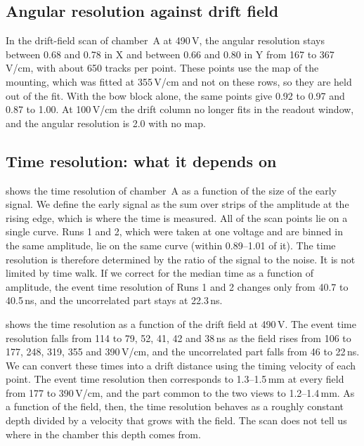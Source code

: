 \subsection{Angular resolution against drift field}
In the drift-field scan of chamber~A at 490\,V, the angular resolution stays between 0.68 and 0.78\textdegree{} in X
and between 0.66 and 0.80\textdegree{} in Y from 167 to 367\,V/cm, with about 650 tracks per point. These points use
the map of the mounting, which was fitted at 355\,V/cm and not on these rows, so they are held out of the fit. With
the bow block alone, the same points give 0.92 to 0.97\textdegree{} and 0.87 to 1.00\textdegree. At 100\,V/cm the
drift column no longer fits in the readout window, and the angular resolution is 2.0\textdegree{} with no map.

\subsection{Time resolution: what it depends on}\label{app:timingdetails}
 shows the time resolution of chamber~A as a function of the size of the early signal. We define the
early signal as the sum over strips of the amplitude at the rising edge, which is where the time is measured. All of
the scan points lie on a single curve. Runs 1 and 2, which were taken at one voltage and are binned in the same
amplitude, lie on the same curve (within 0.89--1.01 of it). The time resolution is therefore determined by the ratio
of the signal to the noise. It is not limited by time walk. If we correct for the median time as a function of
amplitude, the event time resolution of Runs 1 and 2 changes only from 40.7 to 40.5\,ns, and the uncorrelated part
stays at 22.3\,ns.

 shows the time resolution as a function of the drift field at 490\,V. The event time
resolution falls from 114 to 79, 52, 41, 42 and 38\,ns as the field rises from 106 to 177, 248, 319, 355 and
390\,V/cm, and the uncorrelated part falls from 46 to 22\,ns. We can convert these times into a drift distance using
the timing velocity of each point. The event time resolution then corresponds to 1.3--1.5\,mm at every field from 177
to 390\,V/cm, and the part common to the two views to 1.2--1.4\,mm. As a function of the field, then, the time
resolution behaves as a roughly constant depth divided by a velocity that grows with the field. The scan does not
tell us where in the chamber this depth comes from.

